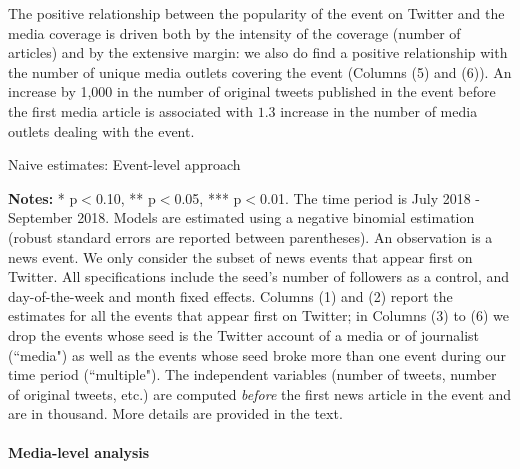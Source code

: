 The positive relationship between the popularity of the event on Twitter and the media coverage is driven both by the intensity of the coverage (number of articles) and by the extensive margin: we also do find a positive relationship with the number of unique media outlets covering the event (Columns (5) and (6)). An increase by 1,000 in the number of original tweets published in the event before the first media article is associated with $1.3$ increase in the number of media outlets dealing with the event.


\begin{table}
\caption{Naive estimates: Event-level approach}
\begin{center}
	
\end{center}
\begin{spacing}{0.5}
	{\fns \textbf{Notes:} * p$<$0.10, ** p$<$0.05, *** p$<$0.01. The time period is July 2018 - September 2018.  Models are estimated using a negative binomial estimation (robust standard errors are reported between parentheses). An observation is a news event. We only consider the subset of news events that appear first on Twitter. All specifications include the seed's number of followers as a control, and day-of-the-week and month fixed effects. Columns (1) and (2) report the estimates for all the events that appear first on Twitter; in Columns (3) to (6) we drop the events whose seed is the Twitter account of a media or of journalist (``media") as well as the events whose seed broke more than one event during our time period (``multiple"). The independent variables (number of tweets, number of original tweets, etc.) are computed \textit{before} the first news article in the event and are in thousand. More details are provided in the text.} 
\end{spacing}
\label{Tab:number_articles_negbinomial_event}
\end{table} 


\paragraph{Media-level analysis}

